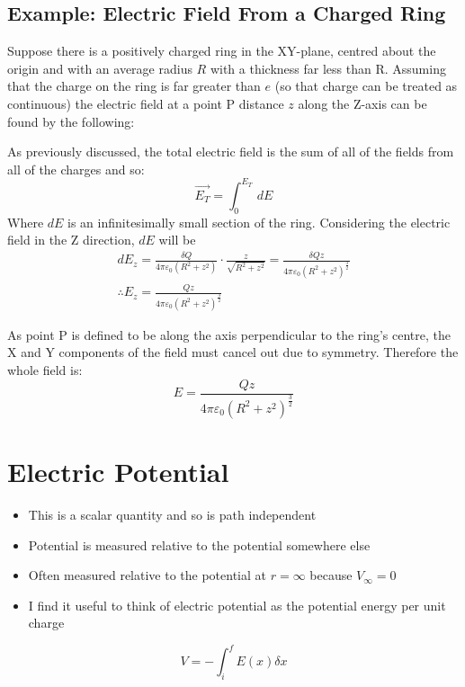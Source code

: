 \documentclass[11pt,a4paper]{report}
\begin{document}
\subsection{Example: Electric Field From a Charged Ring}
Suppose there is a positively charged ring in the XY-plane, centred about the origin and with an average radius $R$ with a thickness far less than R. Assuming that the charge on the ring is far greater than $e$ (so that charge can be treated as continuous) the electric field at a point P distance $z$ along the Z-axis can be found by the following:

As previously discussed, the total electric field is the sum of all of the fields from all of the charges and so:
\begin{equation*}
\vec{E_T} = \int_0^{E_T}\, dE
\end{equation*}
Where $dE$ is an infinitesimally small section of the ring. Considering the electric field in the Z direction, $dE$ will be
\begin{eqnarray*}
	dE_z = \frac{\delta Q}{4\pi\varepsilon_0(R^2+z^2)}\cdot\frac{z}{\sqrt{R^2+z^2}} = \frac{\delta Qz}{4\pi\varepsilon_0(R^2+z^2)^{\frac{3}{2}}} \\
	\therefore E_z = \frac{Qz}{4\pi\varepsilon_0(R^2+z^2)^{\frac{3}{2}}}
\end{eqnarray*}

As point P is defined to be along the axis perpendicular to the ring's centre, the X and Y components of the field must cancel out due to symmetry. Therefore the whole field is:
\begin{equation*}
	E = \frac{Qz}{4\pi\varepsilon_0(R^2+z^2)^{\frac{3}{2}}}
\end{equation*}

\section{Electric Potential}
\begin{itemize}
	\item This is a scalar quantity and so is path independent
	\item Potential is measured relative to the potential somewhere else
	\item Often measured relative to the potential at $r=\infty$ because $V_\infty=0$
	\item I find it useful to think of electric potential as the potential energy per unit charge
\end{itemize}
\begin{equation*}
	V = - \int_i^f E(x)\delta x
\end{equation*}
\end{document}
